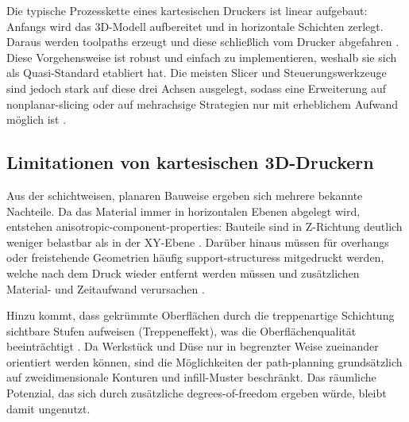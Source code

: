             Die typische Prozesskette eines kartesischen Druckers ist linear aufgebaut: Anfangs wird das 3D-Modell aufbereitet und in horizontale Schichten zerlegt.
            Daraus werden \glspl{toolpath} erzeugt und diese schließlich vom Drucker abgefahren \autocite[vgl.][S.~252--253]{gregoriSlicingTriangleMeshes2014}.
            Diese Vorgehensweise ist robust und einfach zu implementieren, weshalb sie sich als Quasi-Standard etabliert hat.
            Die meisten Slicer und Steuerungswerkzeuge sind jedoch stark auf diese drei Achsen ausgelegt, sodass eine Erweiterung auf \gls{nonplanar-slicing} oder auf mehrachsige Strategien nur mit erheblichem Aufwand möglich ist \autocite[vgl.][S.~2--3]{pelzerAdditiveManufacturingNonplanar2021}.

        \subsection{Limitationen von kartesischen 3D-Druckern}\label{subsec:limitations-cartesian-3d-printers}
            Aus der schichtweisen, planaren Bauweise ergeben sich mehrere bekannte Nachteile.
            Da das Material immer in horizontalen Ebenen abgelegt wird, entstehen \gls{anisotropic-component-properties}: Bauteile sind in Z-Richtung deutlich weniger belastbar als in der XY-Ebene \autocite[vgl.][S.~1--2]{pelzerAdditiveManufacturingNonplanar2021}.
            Darüber hinaus müssen für \glspl{overhang} oder freistehende Geometrien häufig \glspl{support-structures} mitgedruckt werden, welche nach dem Druck wieder entfernt werden müssen und zusätzlichen Material- und Zeitaufwand verursachen \autocite[vgl.][S.~537--538]{brandstoetterRoboterbasierter3DDruckMit2023}.

            Hinzu kommt, dass gekrümmte Oberflächen durch die treppenartige Schichtung sichtbare Stufen aufweisen (Treppeneffekt), was die Oberflächenqualität beeinträchtigt \autocite[vgl.][S.~1--3]{ottonelloQuickCurveRevisitingSlightly2024}.
            Da Werkstück und Düse nur in begrenzter Weise zueinander orientiert werden können, sind die Möglichkeiten der \gls{path-planning} grundsätzlich auf zweidimensionale Konturen und \gls{infill}-Muster beschränkt.
            Das räumliche Potenzial, das sich durch zusätzliche \gls{degrees-of-freedom} ergeben würde, bleibt damit ungenutzt.

